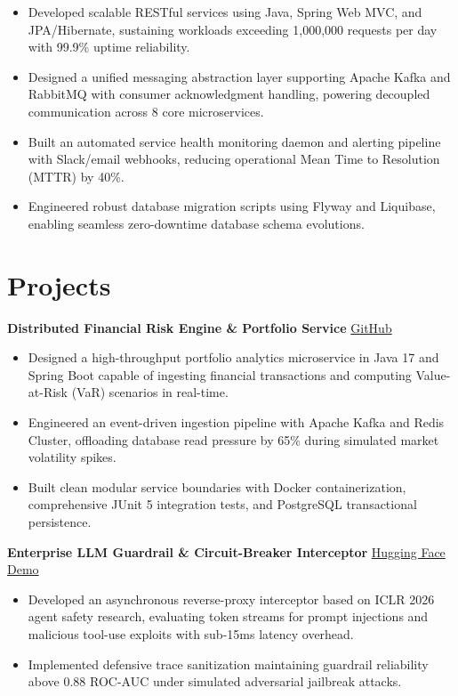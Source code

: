 \documentclass[10pt,a4paper]{article}
\newcommand{\projectheading}[3]{
  \textbf{#1} \hfill
  \href{#2}{#3}\\[-2pt]
}
\begin{document}
\begin{itemize}
  \item Developed scalable RESTful services using Java, Spring Web MVC, and JPA/Hibernate, sustaining workloads exceeding 1,000,000 requests per day with 99.9\% uptime reliability.
  \item Designed a unified messaging abstraction layer supporting Apache Kafka and RabbitMQ with consumer acknowledgment handling, powering decoupled communication across 8 core microservices.
  \item Built an automated service health monitoring daemon and alerting pipeline with Slack/email webhooks, reducing operational Mean Time to Resolution (MTTR) by 40\%.
  \item Engineered robust database migration scripts using Flyway and Liquibase, enabling seamless zero-downtime database schema evolutions.
\end{itemize}


\section{Projects}

\projectheading
  {Distributed Financial Risk Engine \& Portfolio Service}
  {https://github.com/sakshi-labs/}
  {GitHub}

\begin{itemize}
  \item Designed a high-throughput portfolio analytics microservice in Java 17 and Spring Boot capable of ingesting financial transactions and computing Value-at-Risk (VaR) scenarios in real-time.
  \item Engineered an event-driven ingestion pipeline with Apache Kafka and Redis Cluster, offloading database read pressure by 65\% during simulated market volatility spikes.
  \item Built clean modular service boundaries with Docker containerization, comprehensive JUnit 5 integration tests, and PostgreSQL transactional persistence.
\end{itemize}

\medskip

\projectheading
  {Enterprise LLM Guardrail \& Circuit-Breaker Interceptor}
  {https://huggingface.co/spaces/Sakshiii/}
  {Hugging Face Demo}

\begin{itemize}
  \item Developed an asynchronous reverse-proxy interceptor based on ICLR 2026 agent safety research, evaluating token streams for prompt injections and malicious tool-use exploits with sub-15ms latency overhead.
  \item Implemented defensive trace sanitization maintaining guardrail reliability above 0.88 ROC-AUC under simulated adversarial jailbreak attacks.
\end{itemize}
\end{document}

